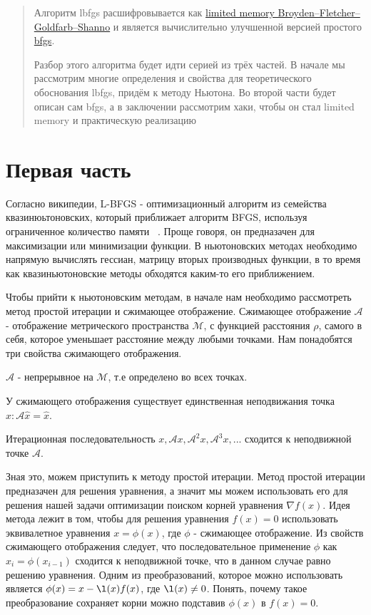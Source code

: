 \documentclass[12pt]{article}
\begin{document}
\thispagestyle{empty}

\begin{abstract}
Алгоритм lbfgs расшифровывается как \href{http://www.ccas.ru/frc}{limited memory Broyden–Fletcher–Goldfarb–Shanno} и является вычислительно улучшенной версией простого \href{https://en.wikipedia.org/wiki/Broyden%E2%80%93Fletcher%E2%80%93Goldfarb%E2%80%93Shanno_algorithm}{bfgs}. 

Разбор этого алгоритма будет идти серией из трёх частей. В начале мы рассмотрим многие определения и свойства  для теоретического обоснования lbfgs, придём к методу Ньютона. Во второй части будет описан сам bfgs, а в заключении рассмотрим хаки, чтобы он стал limited memory и практическую реализацию

\end{abstract}

\section{Первая часть} 
Согласно википедии, L-BFGS - оптимизационный алгоритм из семейства квазинюьтоновских, который приближает алгоритм BFGS, используя ограниченное количество памяти ~\cite{wiki-bfgs}. Проще говоря, он предназачен для максимизации или минимизации функции. В ньютоновских методах необходимо напрямую вычислять гессиан, матрицу вторых производных функции, в то время как квазиньютоновские методы обходятся каким-то его приближением.

Чтобы прийти к ньютоновским методам, в начале нам необходимо рассмотреть метод простой итерации и сжимающее отображение. 
Сжимающее отображение $\mathcal{A}$ - отображение метрического пространства $\mathcal{M}$, с функцией расстояния $\rho$, самого в себя, которое уменьшает расстояние между любыми точками. Нам понадобятся три свойства сжимающего отображения.

$\mathcal{A}$ - непрерывное на $\mathcal{M}$, т.е определено во всех точках.

У сжимающего отображения существует единственная неподвижания точка $\hat{x}: \mathcal{A} \hat{x} = \hat{x}$.

Итерационная последовательность $x, \mathcal{A}x, \mathcal{A}^2x, \mathcal{A}^3x, ... $ сходится к неподвижной точке $\mathcal{A}$.

Зная это, можем приступить к методу простой итерации. Метод простой итерации предназачен для решения уравнения, а значит мы можем использовать его для решения нашей задачи оптимизации поиском корней уравнения $\nabla f(x)$.
Идея метода лежит в том, чтобы для решения уравнения $f(x) = 0$ использовать эквивалетное уравнения $x = \phi(x)$, где $\phi$ - сжимающее отображение. Из свойств сжимающего отображения следует, что последовательное применение $\phi$ как $x_i = \phi(x_{i - 1})$ сходится к неподвижной точке, что в данном случае равно решению уравнения. 
Одним из преобразований, которое можно использовать является $\phi(x) = x - \l(x)f(x)$, где $\l(x) \neq 0$. Понять, почему такое преобразование сохраняет корни можно подставив $\phi(x)$ в $f(x) = 0$.  
\end{document}
